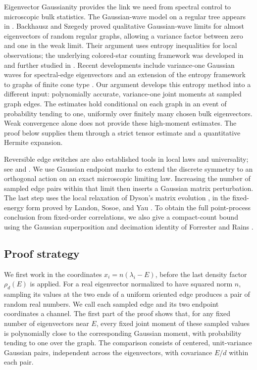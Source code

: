 Eigenvector Gaussianity provides the link we need from spectral control
to microscopic bulk statistics.
The Gaussian-wave model on a regular tree appears in
\cite{ElonEigenvectors,CsokaEtAl}.
Backhausz and Szegedy \cite[Theorems 2.1 and 2.2]{BackhauszSzegedy}
proved qualitative Gaussian-wave limits for almost eigenvectors of
random regular graphs, allowing a variance factor between zero and
one in the weak limit. Their argument uses entropy inequalities for
local observations; the underlying colored-star counting framework
was developed in \cite{BackhauszSzegedyTrees} and further studied in
\cite{BackhauszBordenaveSzegedy}. Recent developments include
variance-one Gaussian waves for spectral-edge eigenvectors
\cite{HeHuangYauWaves} and an extension of the entropy framework to
graphs of finite cone type \cite{DemboMcKenzie}.
Our argument develops this entropy method into a different input:
polynomially accurate, variance-one joint moments at sampled graph
edges. The estimates hold conditional on each graph in an event of
probability tending to one, uniformly over finitely many chosen bulk
eigenvectors. Weak convergence alone does not provide
these high-moment estimates. The proof below supplies them through
a strict tensor estimate and a quantitative Hermite expansion.

Reversible edge switches are also established tools in local laws
and universality; see \cite[Section 3]{BauerschmidtEtAl} and
\cite[Section 7.2]{BauerschmidtHuangYauLocal}.
We use Gaussian endpoint marks to extend the discrete symmetry to
an orthogonal action on an exact microscopic limiting law. Increasing
the number of sampled edge pairs within that limit then inserts a Gaussian
matrix perturbation. The last step uses the local relaxation of
Dyson's matrix evolution \cite{DysonBrownian,LandonYau}, in the
fixed-energy form proved by Landon, Sosoe, and Yau
\cite{LandonSosoeYau}. To obtain the full point-process conclusion
from fixed-order correlations, we also give a compact-count bound
using the Gaussian superposition and decimation identity of
Forrester and Rains \cite{ForresterRains}.

\subsection{Proof strategy}

We first work in the coordinates \(x_i=n(\lambda_i-E)\), before the
last density factor \(\rho_d(E)\) is applied.
For a real eigenvector normalized to have squared norm \(n\), sampling
its values at the two ends of a uniform oriented edge produces a pair
of random real numbers. We call each sampled edge and its two endpoint
coordinates a channel.
The first part of the proof shows that, for any fixed number of
eigenvectors near \(E\), every fixed joint moment of these sampled
values is polynomially close to the corresponding Gaussian moment,
with probability tending to one over the graph.
The comparison consists of centered, unit-variance Gaussian pairs,
independent across the eigenvectors, with covariance \(E/d\) within each pair.

